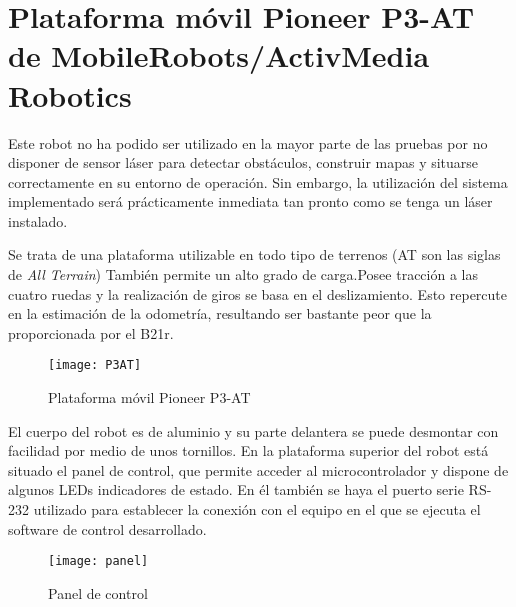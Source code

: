\section{Plataforma móvil Pioneer P3-AT de MobileRobots/ActivMedia Robotics}
Este robot no ha podido ser utilizado en la mayor parte de las pruebas por no disponer de sensor láser para detectar obstáculos, construir mapas y situarse correctamente en su entorno de operación. Sin embargo, la utilización del sistema implementado será prácticamente inmediata tan pronto como se tenga un láser instalado.

Se trata de una plataforma utilizable en todo tipo de terrenos (AT son las siglas de \emph{All Terrain}) También permite un alto grado de carga.Posee tracción a las cuatro ruedas y la realización de giros se basa en el deslizamiento. Esto repercute en la estimación de la odometría, resultando ser bastante peor que la proporcionada por el B21r.

\begin{figure}[h]
  \centering\texttt{[image: P3AT]}\\
  \caption{Plataforma móvil Pioneer P3-AT}\label{fg:P3AT}
\end{figure}

El cuerpo del robot es de aluminio y su parte delantera se puede desmontar con facilidad por medio de unos tornillos. En la plataforma superior del robot está situado el panel de control, que permite acceder al microcontrolador y dispone de algunos LEDs indicadores de estado. En él también se haya el puerto serie RS-232 utilizado para establecer la conexión con el equipo en el que se ejecuta el software de control desarrollado.

\begin{figure}[h]
  \centering\texttt{[image: panel]}\\
  \caption{Panel de control}\label{fg:panel}
\end{figure}

